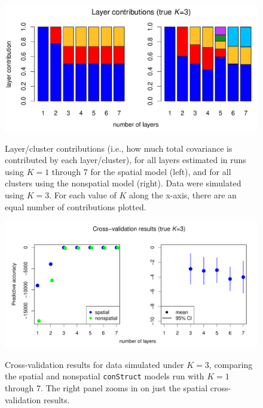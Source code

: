 \documentclass[10pt,letterpaper]{article}
\begin{document}
\begin{figure}
	\centering
		{\includegraphics[width=\textwidth]{figs/sims/simK3_laycon_barplots.pdf}}
		\caption{
			Layer/cluster contributions (i.e., how much total covariance is contributed by each layer/cluster), 
			for all layers estimated in runs using $K = 1$ through 7 
			for the spatial model (left), 
			and for all clusters using the nonspatial model (right).
			Data were simulated using $K=3$.
			For each value of $K$ along the x-axis, there are an equal number of contributions plotted.
		}\label{simK3_laycon}
\end{figure}
\clearpage

\begin{figure}
	\centering
		{\includegraphics[width=\textwidth]{figs/sims/simK3_std_xval.pdf}}
		\caption{
			Cross-validation results for data simulated under $K=3$,
			comparing the spatial and nonspatial \texttt{conStruct} models run with $K=1$ through 7.  
			The right panel zooms in on just the spatial cross-validation results.
		}\label{simK3_xval}
\end{figure}
\clearpage
\end{document}

